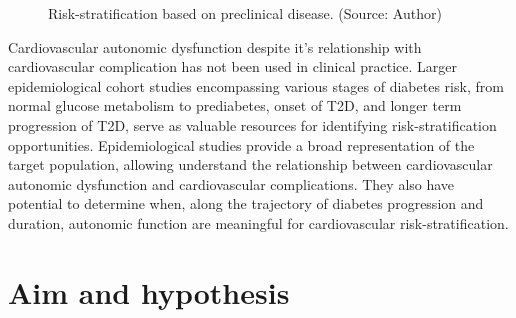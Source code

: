 \documentclass[
  a4paper,
  headsepline=true,
  open=any]{scrbook}
\begin{document}
\begin{figure}

\begin{minipage}[t]{\linewidth}

{\centering 


\caption{Risk-stratification based on preclinical disease. (Source:
Author)}

}

\end{minipage}%

\end{figure}

Cardiovascular autonomic dysfunction despite it's relationship with
cardiovascular complication has not been used in clinical practice.
Larger epidemiological cohort studies encompassing various stages of
diabetes risk, from normal glucose metabolism to prediabetes, onset of
T2D, and longer term progression of T2D, serve as valuable resources for
identifying risk-stratification opportunities. Epidemiological studies
provide a broad representation of the target population, allowing
understand the relationship between cardiovascular autonomic dysfunction
and cardiovascular complications. They also have potential to determine
when, along the trajectory of diabetes progression and duration,
autonomic function are meaningful for cardiovascular
risk-stratification.


\hypertarget{aim-and-hypothesis}{%
\chapter{Aim and hypothesis}\label{aim-and-hypothesis}}
\end{document}
